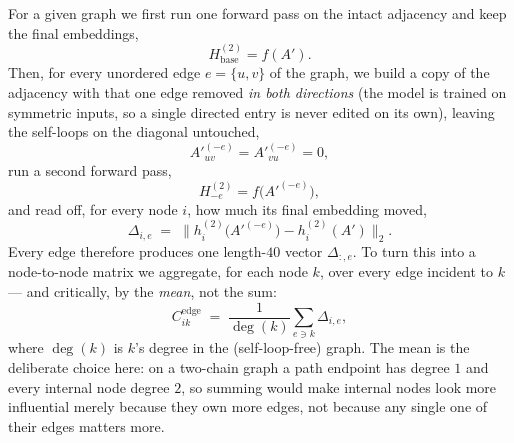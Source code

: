 \documentclass[11pt,a4paper]{article}
\begin{document}
For a given graph we first run one forward pass on the intact adjacency and
keep the final embeddings,
\[ H^{(2)}_{\mathrm{base}} = f(A'). \]
Then, for every unordered edge $e=\{u,v\}$ of the graph, we build a copy of
the adjacency with that one edge removed \emph{in both directions} (the
model is trained on symmetric inputs, so a single directed entry is never
edited on its own), leaving the self-loops on the diagonal untouched,
\[ A'^{(-e)}_{uv} = A'^{(-e)}_{vu} = 0, \]
run a second forward pass,
\[ H^{(2)}_{-e} = f\big(A'^{(-e)}\big), \]
and read off, for every node $i$, how much its final embedding moved,
\[ \Delta_{i,e} \;=\; \big\| h_i^{(2)}\big(A'^{(-e)}\big) - h_i^{(2)}(A') \big\|_2. \]
Every edge therefore produces one length-$40$ vector $\Delta_{:,e}$. To turn
this into a node-to-node matrix we aggregate, for each node $k$, over every
edge incident to $k$ --- and critically, by the \emph{mean}, not the sum:
\[ C^{\mathrm{edge}}_{ik} \;=\; \frac{1}{\deg(k)}\sum_{e\ni k}\Delta_{i,e}, \]
where $\deg(k)$ is $k$'s degree in the (self-loop-free) graph. The mean is
the deliberate choice here: on a two-chain graph a path endpoint has degree
$1$ and every internal node degree $2$, so summing would make internal
nodes look more influential merely because they own more edges, not because
any single one of their edges matters more.
\end{document}
